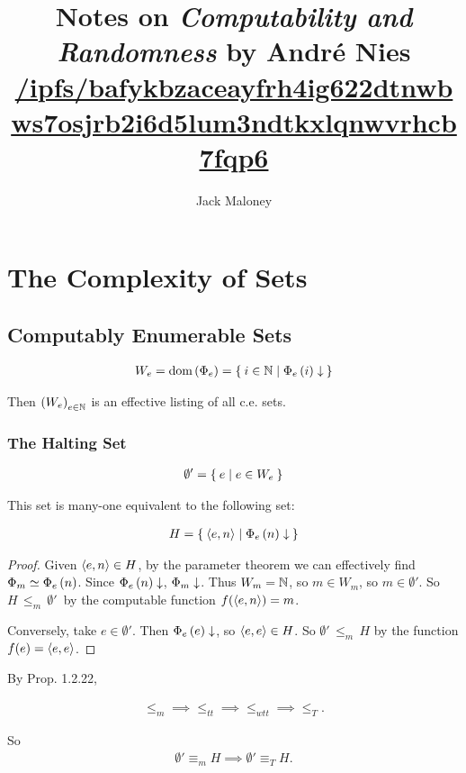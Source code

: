 \documentclass[11pt]{article}
\title{Notes on \textit{Computability and Randomness} by André Nies \\
	\small{\href{https://ipfs.io/ipfs/bafykbzaceayfrh4ig622dtnwbws7osjrb2i6d5lum3ndtkxlqnwvrhcb7fqp6}
	{/ipfs/bafykbzaceayfrh4ig622dtnwbws7osjrb2i6d5lum3ndtkxlqnwvrhcb7fqp6}}}
\author{Jack Maloney}
\date{}
\renewcommand{\P}[1]{{\Phi}_{#1}}
\newcommand{\Pe}{\P{e}}
\newcommand{\PP}[2]{ \P{#1} \Parens{#2} }
\newcommand{\PeP}[1]{ \PP{e}{#1} }
\newcommand{\Cvgs}[1]{{#1 \converges}}
\begin{document}
\maketitle

\section{The Complexity of Sets}

\subsection{Computably Enumerable Sets}

\begin{align}
	W_e 
	= \text{dom} \Parens{\Pe} 
	= \Set{ i \in \N | \Cvgs{\PeP{i}} }
\end{align}

Then \( \left( W_e \right)_{e \in \mathbb{N}} \) is an effective listing of all c.e. sets.

\subsubsection{The Halting Set}

\begin{align}
	\emptyset' = \Set{ e | e \in W_e }
\end{align}

This set is many-one equivalent to the following set:

\begin{align}
	H = \Set{ \braket{e, n} | \Cvgs{\PeP{n} } }
\end{align}

\begin{proof}
	Given \( \braket{e,n} \in H \), by the parameter theorem we can effectively find \( \P{m} \simeq \PeP{n} \). Since \( \Cvgs{\PeP{n}} \), \( \Cvgs{ \P{m} } \). Thus \( W_m = \mathbb{N} \), so \( m \in W_m \), so \( m \in \emptyset' \). So \( H \, {\leq}_m \, \emptyset' \)\ by the computable function \( f(\braket{e, n}) = m \).
	
	Conversely, take \(e \in \emptyset' \). Then \( \Cvgs{\PeP{e}} \), so \( \braket{e,e} \in H \). So \( \emptyset' \, {\leq}_m \, H \) by the function \( f(e) = \braket{e,e} \).
\end{proof}

By Prop. 1.2.22, 

\begin{align}
	{\leq}_m \implies {\leq}_{tt} \implies {\leq}_{wtt} \implies {\leq}_{T}.  
\end{align}

So 
\begin{align}
	\emptyset' \equiv_m H \implies \emptyset' \equiv_T H.
\end{align}
\end{document}
